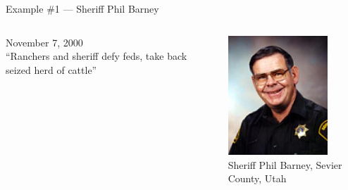 \begin{frame}{Example \#1 --- Sheriff Phil Barney}
    \begin{columns}[onlytextwidth]
            November 7, 2000 \\
            \vspace{10pt}
            { \Large ``Ranchers and sheriff defy feds, take back seized herd of cattle'' }

            \centering
            \includegraphics[width=0.75\textwidth]{img/phil-barney.png} \\
            Sheriff Phil Barney, Sevier County, Utah \\
    \end{columns}
\end{frame}

